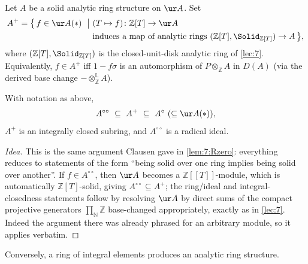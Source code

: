 \begin{definition}
\label{def:8:Aplus-from-analytic}
Let $A$ be a solid analytic ring structure on $\ur A$. Set
\begin{equation*}
\begin{aligned}
A^{+}=\bigl\{\,f\in\ur A(\ast)\ \bigm|\ & (T\mapsto f)\colon\mathbb{Z}[T]\to\ur A\\
&\text{induces a map of analytic rings }(\mathbb{Z}[T],\Solid_{\mathbb{Z}[T]})\to A\,\bigr\},
\end{aligned}
\end{equation*}
where $(\mathbb{Z}[T],\Solid_{\mathbb{Z}[T]})$ is the closed-unit-disk analytic
ring of \cref{lec:7}. Equivalently, $f\in A^{+}$ iff $1-f\sigma$ is an
automorphism of $P\otimes_{\mathbb{Z}}A$ in $D(A)$ (via the derived base change
$-\otimes^{\mathbb{L}}_{\mathbb{Z}}A$).
\end{definition}

\begin{proposition}
\label{prop:8:Aplus-integrally-closed}
With notation as above,
\begin{equation*}
A^{\circ\circ}\ \subseteq\ A^{+}\ \subseteq\ A^{\circ}\ (\subseteq\ur A(\ast)),
\end{equation*}
$A^{+}$ is an integrally closed subring, and $A^{\circ\circ}$ is a radical ideal.
\end{proposition}

\begin{proof}[Idea]
This is the same argument Clausen gave in \cref{lem:7:Rzero}: everything reduces
to statements of the form ``being solid over one ring implies being solid over
another''. If $f\in A^{\circ\circ}$, then $\ur A$ becomes a
$\mathbb{Z}[\![T]\!]$-module, which is automatically $\mathbb{Z}[T]$-solid, giving
$A^{\circ\circ}\subseteq A^{+}$; the ring/ideal and integral-closedness
statements follow by resolving $\ur A$ by direct sums of the compact projective
generators $\prod_{\mathbb{N}}\mathbb{Z}$ base-changed appropriately, exactly as
in \cref{lec:7}. Indeed the argument there was already phrased for an arbitrary
module, so it applies verbatim.
\end{proof}

Conversely, a ring of integral elements produces an analytic ring structure.

